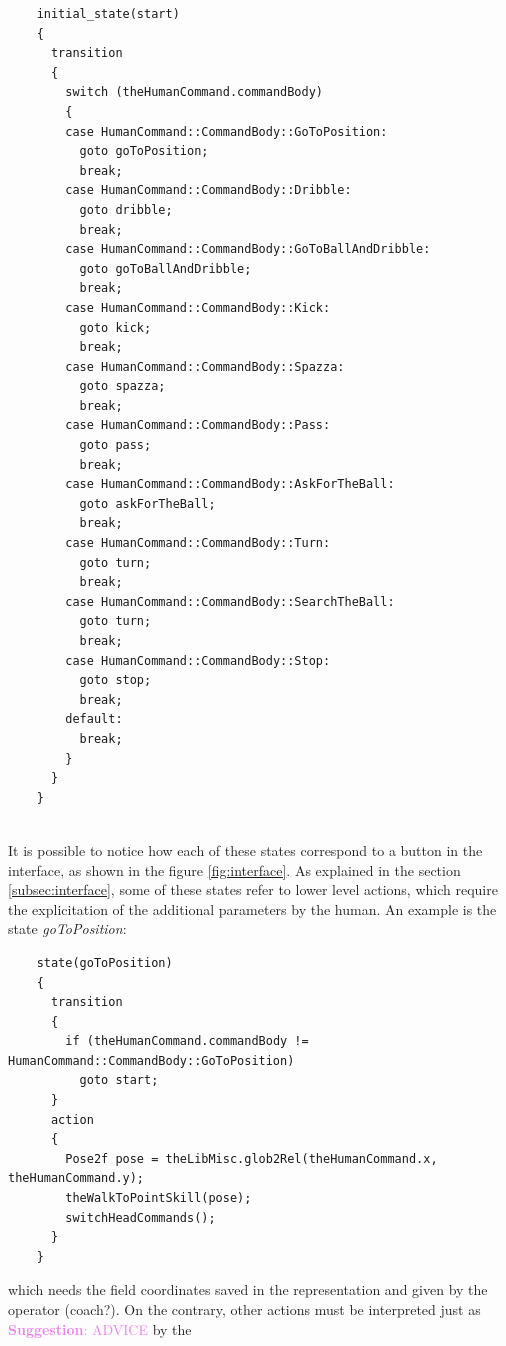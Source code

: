 \documentclass[a4paper, onecolumn, 12pt]{article}
\newcommand\suggestion[1]{\textcolor{violet}{\textbf{Suggestion}: #1}}
\begin{document}
\begin{verbatim}
    initial_state(start)
    {
      transition
      {
        switch (theHumanCommand.commandBody)
        { 
        case HumanCommand::CommandBody::GoToPosition:
          goto goToPosition;
          break;
        case HumanCommand::CommandBody::Dribble:
          goto dribble;
          break;
        case HumanCommand::CommandBody::GoToBallAndDribble:
          goto goToBallAndDribble;
          break;
        case HumanCommand::CommandBody::Kick:
          goto kick;
          break;
        case HumanCommand::CommandBody::Spazza:
          goto spazza;
          break;
        case HumanCommand::CommandBody::Pass:
          goto pass;
          break;
        case HumanCommand::CommandBody::AskForTheBall:
          goto askForTheBall;
          break;
        case HumanCommand::CommandBody::Turn:
          goto turn;
          break;
        case HumanCommand::CommandBody::SearchTheBall:
          goto turn;
          break;
        case HumanCommand::CommandBody::Stop:
          goto stop;
          break;
        default:
          break;
        }
      }
    }
   
\end{verbatim}

It is possible to notice how each of these states correspond to a button in the interface,
as shown in the figure \ref{fig:interface}.
As explained in the section \ref{subsec:interface}, some of these states refer to lower 
level actions, which require the explicitation of the additional parameters by the human.
An example is the state \textit{goToPosition}:

\begin{verbatim}
    state(goToPosition)
    {
      transition
      {
        if (theHumanCommand.commandBody != HumanCommand::CommandBody::GoToPosition)
          goto start;
      }
      action
      {
        Pose2f pose = theLibMisc.glob2Rel(theHumanCommand.x, theHumanCommand.y);
        theWalkToPointSkill(pose);
        switchHeadCommands();
      }
    }

\end{verbatim}

which needs the field coordinates saved in the representation and given by the operator (coach?).
On the contrary, other actions must be interpreted just as \suggestion{ADVICE} by the 
\end{document}
